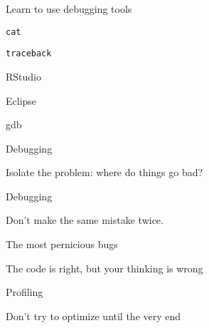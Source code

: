 \documentclass[12pt,t]{beamer}
\begin{document}
\begin{frame}{Learn to use debugging tools}


\bbi
\item {\tt cat}
\item {\tt traceback}
\item RStudio
\item Eclipse
\item gdb
\ei

\note{
}
\end{frame}



\begin{frame}[c]{Debugging}


\centerline{Isolate the problem: where do things go bad?}

\end{frame}




\begin{frame}[c]{Debugging}


\centerline{Don't make the same mistake twice.}

\end{frame}









\begin{frame}[c]{The most pernicious bugs}

\centerline{The code is right, but your thinking is wrong}

\vspace{24pt}


\vspace{24pt}


\end{frame}




\begin{frame}[c]{Profiling}

\centerline{Don't try to optimize until the {\hilit very} end}


\note{
}
\end{frame}
\end{document}
